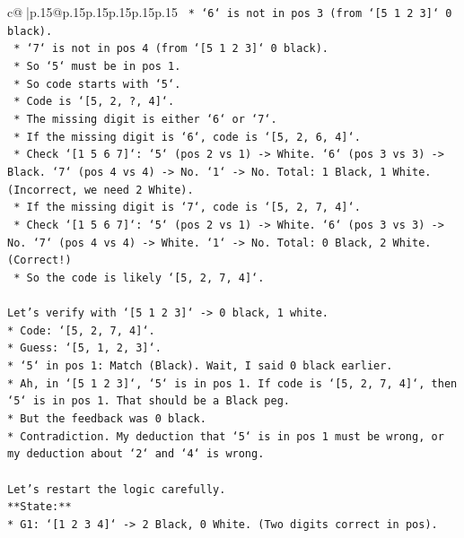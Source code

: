 \documentclass{article}
\begin{document}
{\begin{supertabular}{c@{$\;$}|p{.15\linewidth}@{}p{.15\linewidth}p{.15\linewidth}p{.15\linewidth}p{.15\linewidth}p{.15\linewidth}}
{{{\texttt{                *   `6` is not in pos 3 (from `{[}5 1 2 3{]}` 0 black).} \\
\texttt{                *   `7` is not in pos 4 (from `{[}5 1 2 3{]}` 0 black).} \\
\texttt{                *   So `5` must be in pos 1.} \\
\texttt{                *   So code starts with `5`.} \\
\texttt{                *   Code is `{[}5, 2, ?, 4{]}`.} \\
\texttt{                *   The missing digit is either `6` or `7`.} \\
\texttt{                *   If the missing digit is `6`, code is `{[}5, 2, 6, 4{]}`.} \\
\texttt{                    *   Check `{[}1 5 6 7{]}`: `5` (pos 2 vs 1) {-}> White. `6` (pos 3 vs 3) {-}> Black. `7` (pos 4 vs 4) {-}> No. `1` {-}> No. Total: 1 Black, 1 White. (Incorrect, we need 2 White).} \\
\texttt{                *   If the missing digit is `7`, code is `{[}5, 2, 7, 4{]}`.} \\
\texttt{                    *   Check `{[}1 5 6 7{]}`: `5` (pos 2 vs 1) {-}> White. `6` (pos 3 vs 3) {-}> No. `7` (pos 4 vs 4) {-}> White. `1` {-}> No. Total: 0 Black, 2 White. (Correct!)} \\
\texttt{                *   So the code is likely `{[}5, 2, 7, 4{]}`.} \\
\\ 
\texttt{Let's verify with `{[}5 1 2 3{]}` {-}> 0 black, 1 white.} \\
\texttt{*   Code: `{[}5, 2, 7, 4{]}`.} \\
\texttt{*   Guess: `{[}5, 1, 2, 3{]}`.} \\
\texttt{*   `5` in pos 1: Match (Black). Wait, I said 0 black earlier.} \\
\texttt{*   Ah, in `{[}5 1 2 3{]}`, `5` is in pos 1. If code is `{[}5, 2, 7, 4{]}`, then `5` is in pos 1. That should be a Black peg.} \\
\texttt{*   But the feedback was 0 black.} \\
\texttt{*   Contradiction. My deduction that `5` is in pos 1 must be wrong, or my deduction about `2` and `4` is wrong.} \\
\\ 
\texttt{Let's restart the logic carefully.} \\
\texttt{**State:**} \\
\texttt{*   G1: `{[}1 2 3 4{]}` {-}> 2 Black, 0 White. (Two digits correct in pos).} \\
}}}
\end{supertabular}}
\end{document}
